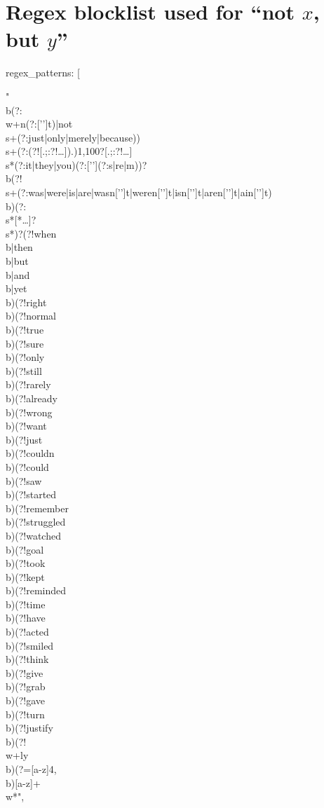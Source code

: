 \documentclass[11pt]{article}
\begin{document}
\section{Regex blocklist used for ``not $x$, but $y$''}
\label{app:notxbuty-regex}
\begin{cfgblock}
regex_patterns: [
  
  "\\b(?:\\w+n(?:['’]t)|not\\s+(?:just|only|merely|because))\\s+(?:(?![.;:?!…]).){1,100}?[.;:?!…]\\s*(?:it|they|you)(?:['’](?:s|re|m))?\\b(?!\\s+(?:was|were|is|are|wasn['’]t|weren['’]t|isn['’]t|aren['’]t|ain['’]t)\\b)(?:\\s*[*…]?\\s*)?(?!when\\b|then\\b|but\\b|and\\b|yet\\b)(?!right\\b)(?!normal\\b)(?!true\\b)(?!sure\\b)(?!only\\b)(?!still\\b)(?!rarely\\b)(?!already\\b)(?!wrong\\b)(?!want\\b)(?!just\\b)(?!couldn\\b)(?!could\\b)(?!saw\\b)(?!started\\b)(?!remember\\b)(?!struggled\\b)(?!watched\\b)(?!goal\\b)(?!took\\b)(?!kept\\b)(?!reminded\\b)(?!time\\b)(?!have\\b)(?!acted\\b)(?!smiled\\b)(?!think\\b)(?!give\\b)(?!grab\\b)(?!gave\\b)(?!turn\\b)(?!justify\\b)(?!\\w+ly\\b)(?=[a-z]{4,}\\b)[a-z]+\\w*",


\end{cfgblock}
\end{document}
